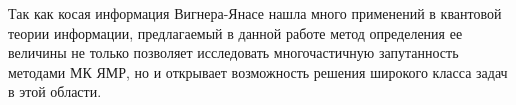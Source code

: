 Так как косая информация Вигнера-Янасе нашла много применений в квантовой теории информации, %
предлагаемый в данной работе метод определения ее величины
не только позволяет исследовать многочастичную запутанность методами МК ЯМР,
но и открывает возможность решения широкого класса задач в этой области.